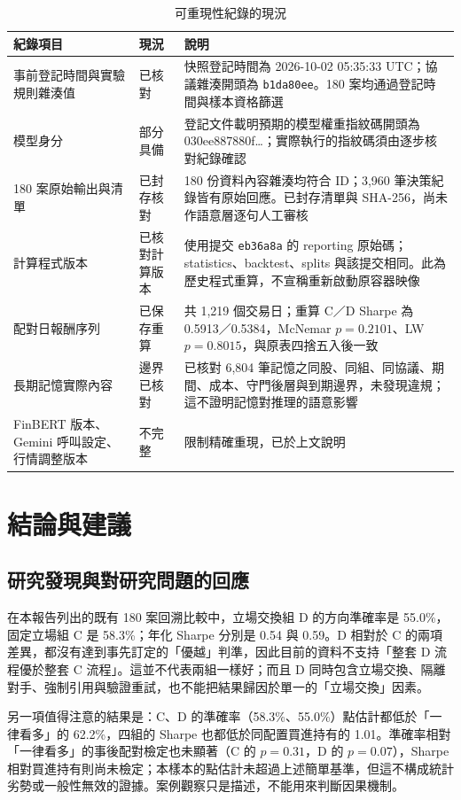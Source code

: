 \begin{table}[H]
\centering\small
\caption{可重現性紀錄的現況}
\label{tab:prov}
\begin{tabularx}{\textwidth}{@{}L{.25} L{.15} Y@{}}
\toprule
紀錄項目 & 現況 & 說明 \\
\midrule
事前登記時間與實驗規則雜湊值 & 已核對 & 快照登記時間為 2026-10-02 05:35:33 UTC；協議雜湊開頭為 \texttt{b1da80ee}。180 案均通過登記時間與樣本資格篩選 \\
模型身分 & 部分具備 & 登記文件載明預期的模型權重指紋碼開頭為 030ee887880f…；實際執行的指紋碼須由逐步核對紀錄確認 \\
180 案原始輸出與清單 & 已封存核對 & 180 份資料內容雜湊均符合 ID；3,960 筆決策紀錄皆有原始回應。已封存清單與 SHA-256，尚未作語意層逐句人工審核 \\
計算程式版本 & 已核對計算版本 & 使用提交 \texttt{eb36a8a} 的 reporting 原始碼；statistics、backtest、splits 與該提交相同。此為歷史程式重算，不宣稱重新啟動原容器映像 \\
配對日報酬序列 & 已保存重算 & 共 1,219 個交易日；重算 C／D Sharpe 為 0.5913／0.5384，McNemar $p=0.2101$、LW $p=0.8015$，與原表四捨五入後一致 \\
長期記憶實際內容 & 邊界已核對 & 已核對 6,804 筆記憶之同股、同組、同協議、期間、成本、守門後層與到期邊界，未發現違規；這不證明記憶對推理的語意影響 \\
FinBERT 版本、Gemini 呼叫設定、行情調整版本 & 不完整 & 限制精確重現，已於上文說明 \\
\bottomrule
\end{tabularx}
\end{table}


\clearpage\section{結論與建議}

\subsection{研究發現與對研究問題的回應}

在本報告列出的既有 180 案回溯比較中，立場交換組 D 的方向準確率是 55.0\%，固定立場組 C 是 58.3\%；年化 Sharpe 分別是 0.54 與 0.59。D 相對於 C 的兩項差異，都沒有達到事先訂定的「優越」判準，因此目前的資料不支持「整套 D 流程優於整套 C 流程」。這並不代表兩組一樣好；而且 D 同時包含立場交換、隔離對手、強制引用與驗證重試，也不能把結果歸因於單一的「立場交換」因素。

另一項值得注意的結果是：C、D 的準確率（58.3\%、55.0\%）點估計都低於「一律看多」的 62.2\%，四組的 Sharpe 也都低於同配置買進持有的 1.01。準確率相對「一律看多」的事後配對檢定也未顯著（C 的 $p=0.31$，D 的 $p=0.07$），Sharpe 相對買進持有則尚未檢定；本樣本的點估計未超過上述簡單基準，但這不構成統計劣勢或一般性無效的證據。案例觀察只是描述，不能用來判斷因果機制。

